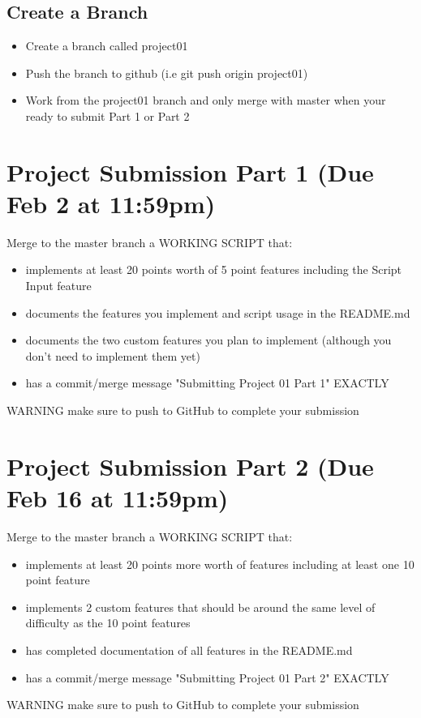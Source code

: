 \documentclass[11pt]{article}
\begin{document}
\subsection{Create a Branch}
\label{sec:org55ef7d8}
\begin{itemize}
\item Create a branch called {\color{purple}project01}
\item Push the branch to github (i.e {\color{purple}git push origin project01})
\item Work from the {\color{purple}project01} branch and {\color{red}only merge with master when your ready to submit Part 1 or Part 2}
\end{itemize}

\newpage

\section{Project Submission Part 1 (Due Feb 2 at 11:59pm)}
\label{sec:orge4abc2f}
Merge to the master branch a {\color{purple}WORKING SCRIPT} that:
\begin{itemize}
\item implements at least {\color{purple}20 points} worth of {\color{purple}5 point} features including the
{\color{purple}Script Input} feature
\item documents the features you implement and script usage in the {\color{purple}README.md}
\item documents the {\color{purple}two custom features} you plan to implement (although you
don't need to implement them yet)
\item has a commit/merge message {\color{olive}"Submitting Project 01 Part 1"} {\color{purple}EXACTLY}
\end{itemize}
{\color{red}WARNING} make sure to push to GitHub to complete your submission 

\section{Project Submission Part 2 (Due Feb 16 at 11:59pm)}
\label{sec:orge811c1c}
Merge to the master branch a {\color{purple}WORKING SCRIPT} that:
\begin{itemize}
\item implements at least {\color{purple}20 points} more worth of features
including {\color{purple}at least one 10 point feature}
\item implements {\color{purple}2 custom features} that should be around the same level of
difficulty as the {\color{purple}10 point features}
\item has completed documentation of all features in the {\color{purple}README.md}
\item has a commit/merge message {\color{olive}"Submitting Project 01 Part 2"} {\color{purple}EXACTLY}
\end{itemize}
{\color{red}WARNING} make sure to push to GitHub to complete your submission
\end{document}
